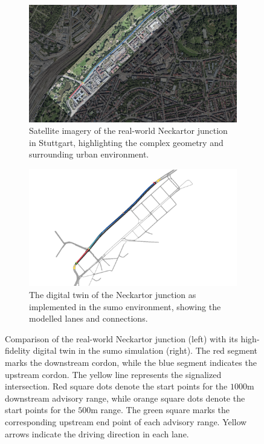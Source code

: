 \begin{figure}[htb]
  \centering
  \begin{subfigure}[b]{0.98\textwidth}
    \includegraphics[width=\linewidth, page=1]{data/img/Neckartor/StuttgartNeckartorReal.pdf}
    \caption[Neckartor junction satellite image]{Satellite imagery of the real-world Neckartor junction in Stuttgart, highlighting the complex geometry and surrounding urban environment.}
    \label{fig:NeckartorMapReal}
  \end{subfigure}
  \hfill
  \begin{subfigure}[b]{0.98\textwidth}
    \includegraphics[width=\linewidth, page=1]{data/img/Neckartor/StuttgartNeckartorSumo.pdf}
    \caption[Digital twin of Neckartor in \ac{sumo}]{The digital twin of the Neckartor junction as implemented in the \ac{sumo} environment, showing the modelled lanes and connections.}
    \label{fig:NeckartorMapSUMO}
  \end{subfigure}
  \caption[Real-World vs. Simulated Neckartor Junction]{%
  Comparison of the real-world Neckartor junction (left) with its high-fidelity digital twin in the \ac{sumo} simulation (right). 
  The red segment marks the downstream cordon, while the blue segment indicates the upstream cordon. 
  The yellow line represents the signalized intersection. 
  Red square dots denote the start points for the $1000\unit{\metre}$ downstream advisory range, while orange square dots denote the start points for the $500\unit{\metre}$ range. 
  The green square marks the corresponding upstream end point of each advisory range. 
  Yellow arrows indicate the driving direction in each lane.}
  \label{fig:NeckartorMapComparison}
\end{figure}

